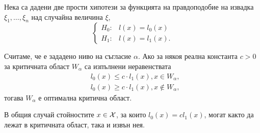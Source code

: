 \documentclass[numbers=endperiod, DIV=15, bibliography=totocnumbered]{scrartcl}
\begin{document}
\begin{lemma}
  Нека са дадени две прости хипотези за функцията на правдоподобие на извадка $\xi_1, \ldots, \xi_n$ над случайна величина $\xi$,
  \begin{displaymath}
    \begin{cases}
      H_0: &l(x) = l_0(x) \\
      H_1: &l(x) = l_1(x).
    \end{cases}
  \end{displaymath}

  Считаме, че е зададено ниво на съгласие $\alpha$. Ако за някоя реална константа $c > 0$ за критичната област $W_\alpha$ са изпълнени неравенствата
  \begin{align*}
    &l_0(x) \leq c \cdot l_1(x), x \in W_\alpha, \\
    &l_0(x) \geq c \cdot l_1(x), x \not\in W_\alpha,
  \end{align*}
  тогава $W_\alpha$ е оптимална критична област.
\end{lemma}

\begin{note}
  В общия случай стойностите $x \in \mathcal{X}$, за които $l_0(x) = cl_1(x)$, могат както да лежат в критичната област, така и извън нея.
\end{note}
\end{document}
